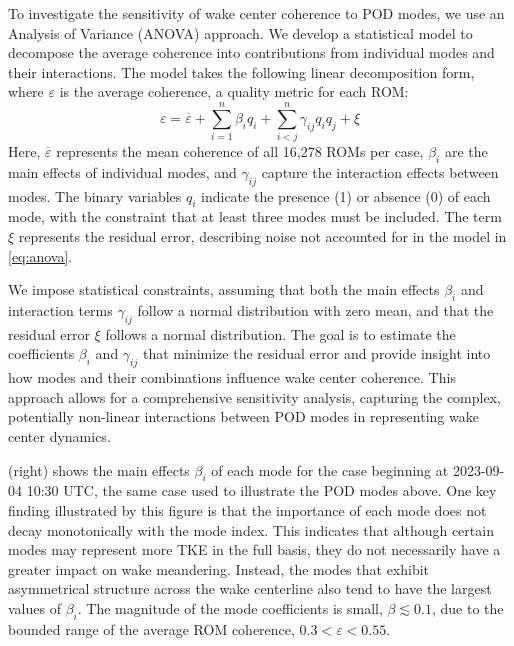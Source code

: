 \documentclass[%
 aip,
 amsmath,
 amssymb,
]{revtex4-2}
\begin{document}
To investigate the sensitivity of wake center coherence to POD modes, we use an Analysis of Variance (ANOVA) approach.\cite{sahaiAnalysisVarianceFixed2012}
We develop a statistical model to decompose the average coherence into contributions from individual modes and their interactions.
The model takes the following linear decomposition form, where $\varepsilon$ is the average coherence, a quality metric for each ROM:
\begin{equation}
\varepsilon = \overline{\varepsilon} + \sum_{i=1}^{n} \beta_i q_i + \sum_{i<j}^{n} \gamma_{ij} q_i q_j + \xi
\label{eq:anova}
\end{equation}
Here, $\overline{\varepsilon}$ represents the mean coherence of all 16,278 ROMs per case, $\beta_i$ are the main effects of individual modes, and $\gamma_{ij}$ capture the interaction effects between modes.
The binary variables $q_i$ indicate the presence (1) or absence (0) of each mode, with the constraint that at least three modes must be included. The term $\xi$ represents the residual error, describing noise not accounted for in the model in \cref{eq:anova}.

We impose statistical constraints, assuming that both the main effects $\beta_i$ and interaction terms $\gamma_{ij}$ follow a normal distribution with zero mean, and that the residual error $\xi$ follows a normal distribution.
The goal is to estimate the coefficients $\beta_i$ and $\gamma_{ij}$ that minimize the residual error and provide insight into how modes and their combinations influence wake center coherence.
This approach allows for a comprehensive sensitivity analysis, capturing the complex, potentially non-linear interactions between POD modes in representing wake center dynamics.

 (right) shows the main effects $\beta_i$ of each mode for the case beginning at 2023-09-04 10:30 UTC, the same case used to illustrate the POD modes above.
One key finding illustrated by this figure is that the importance of each mode does not decay monotonically with the mode index.
This indicates that although certain modes may represent more TKE in the full basis, they do not necessarily have a greater impact on wake meandering.
Instead, the modes that exhibit asymmetrical structure across the wake centerline also tend to have the largest values of $\beta_i$.
The magnitude of the mode coefficients is small, $\beta \lesssim 0.1$, due to the bounded range of the average ROM coherence, $0.3 < \varepsilon < 0.55$.
\end{document}
